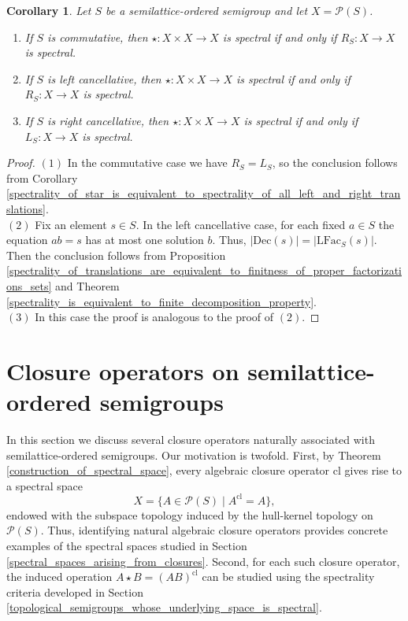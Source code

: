 \documentclass[10pt, reqno]{amsart}
\theoremstyle{plain}
\newtheorem{corollary}[theorem]{Corollary}
\theoremstyle{definition}
\begin{document}
\begin{corollary}
    Let $S$ be a semilattice-ordered semigroup and let $X = \mathcal{P}(S)$. 
    \begin{enumerate}[label=(\arabic*)]
        \item If $S$ is commutative, then $\star: X \times X \to X$ is spectral if and only if  $R_S: X \to X$ is spectral.
        \item If $S$ is left cancellative, then $\star: X \times X \to X$ is spectral if and only if $R_S: X \to X$ is spectral.
        \item If $S$ is right cancellative, then $\star: X \times X \to X$ is spectral if and only if $L_S: X \to X$ is spectral. 
    \end{enumerate}
\end{corollary}
\begin{proof}
    $(1)$ In the commutative case we have $R_S = L_S$, so the conclusion follows from Corollary \ref{spectrality_of_star_is_equivalent_to_spectrality_of_all_left_and_right_translations}. \\
    $(2)$ Fix an element $s \in S$. In the left cancellative case, for each fixed $a \in S$ the equation $ab = s$ has at most one solution $b$. Thus, $|\mathrm{Dec}(s)| = |\mathrm{LFac}_S(s)|.$ Then the conclusion follows from Proposition \ref{spectrality_of_translations_are_equivalent_to_finitness_of_proper_factorizations_sets} and Theorem \ref{spectrality_is_equivalent_to_finite_decomposition_property}. \\
    $(3)$ In this case the proof is analogous to the proof of $(2)$. 
\end{proof}

\section{Closure operators on semilattice-ordered semigroups}\label{closures_on_semigroups}
In this section we discuss several closure operators naturally associated with semilattice-ordered semigroups. Our motivation is twofold. First, by Theorem \ref{construction_of_spectral_space}, every algebraic closure operator $\mathrm{cl}$ gives rise to a spectral space 
\begin{equation*}
    X = \{A \in \mathcal{P}(S) \mid A^\mathrm{cl} = A\},
\end{equation*}
endowed with the subspace topology induced by the hull-kernel topology on $\mathcal{P}(S)$. Thus, identifying natural algebraic closure operators provides concrete examples of the spectral spaces studied in Section \ref{spectral_spaces_arising_from_closures}. Second, for each such closure operator, the induced operation $A \star B = (AB)^\mathrm{cl}$ can be studied using the spectrality criteria developed in Section \ref{topological_semigroups_whose_underlying_space_is_spectral}.
\end{document}

